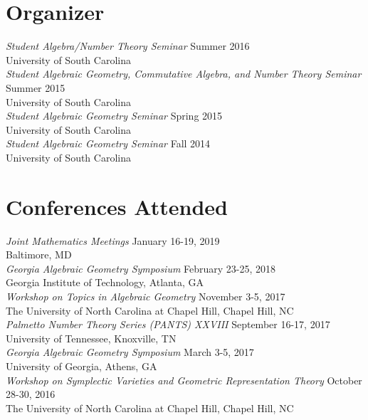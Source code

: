 \documentclass{article}
\begin{document}
\section*{Organizer}
\textsl{Student Algebra/Number Theory Seminar} \hfill Summer 2016\\
University of South Carolina\\

\noindent\textsl{Student Algebraic Geometry, Commutative Algebra, and Number Theory Seminar} \hfill Summer 2015\\
University of South Carolina\\

\noindent\textsl{Student Algebraic Geometry Seminar} \hfill Spring 2015\\
University of South Carolina\\

\noindent\textsl{Student Algebraic Geometry Seminar} \hfill Fall 2014\\
University of South Carolina

\section*{Conferences Attended}
\textsl{Joint Mathematics Meetings} \hfill January 16-19, 2019\\
Baltimore, MD\\

\noindent\textsl{Georgia Algebraic Geometry Symposium} \hfill February 23-25, 2018\\
Georgia Institute of Technology, Atlanta, GA\\

\noindent\textsl{Workshop on Topics in Algebraic Geometry} \hfill November 3-5, 2017\\
The University of North Carolina at Chapel Hill, Chapel Hill, NC\\

\noindent\textsl{Palmetto Number Theory Series (PANTS) XXVIII} \hfill September 16-17, 2017\\
University of Tennessee, Knoxville, TN\\

\noindent\textsl{Georgia Algebraic Geometry Symposium} \hfill March 3-5, 2017\\
University of Georgia, Athens, GA\\

\noindent\textsl{Workshop on Symplectic Varieties and Geometric Representation Theory} \hfill October 28-30, 2016\\
The University of North Carolina at Chapel Hill, Chapel Hill, NC\\
\end{document}
